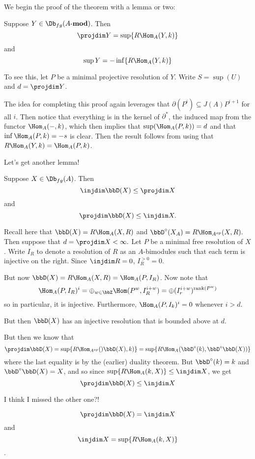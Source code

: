 \documentclass[12pt]{article}
\newcommand*{\Amod}{A\text{-}\mathbf{mod}}
\begin{document}
We begin the proof of the theorem with a lemma or two:
\begin{lem}
	Suppose $Y\in\Db_{fg}(\Amod)$. Then 
	\[\projdim Y=\sup\{R\Hom_A(Y,k)\}\]
	and 
	\[\sup Y=-\inf\{R\Hom_A(Y,k)\}\]
\end{lem}
\begin{prf}
	To see this, let $P$ be a minimal projective resolution of $Y$. Write $S=\sup(U)$ and $d=\projdim Y$.
	
	The idea for completing this proof again leverages that $\partial(P^i)\subseteq J(A)P^{i+1}$ for all $i$. Then notice that 
	everything is in the kernel of $\partial^\ast$, the induced map from the functor $\Hom_A(-,k)$, which then implies that
	$\sup(\Hom_A(P,k))=d$ and that $\inf \Hom_A(P,k)=-s$ is clear. Then the result follows from using that $R\Hom_A(Y,k)=\Hom_A(P,k)$.
\end{prf}
Let's get another lemma!
\begin{lem}
	Suppose $X\in\Db_{fg}(A)$. Then 
	\[\injdim\bbD(X)\le \projdim X\]
	and 
	\[\projdim \bbD(X)\le\injdim X.\]
\end{lem}
\begin{prf}
	Recall here that $\bbD(X)=R\Hom_A(X,R)$ and $\bbD^\circ(X_A)=R\Hom_{A^{op}}(X,R).$ Then suppose that $d=\projdim X<\infty.$ Let $P$ be a minimal 
	free resolution of $X$. Write $I_R$ to denote a resolution of $R$ as an $A$-bimodules such that each term is injective on the right. Since $\injdim R=0$, $I_R^{>0}=0.$

	But now $\bbD(X)=R\Hom_A(X,R)=\Hom_A(P,I_R)$. Now note that 
	\[\Hom_A(P,I_R)^i=\oplus_{w\in\bbZ}\Hom(P^w,I_R^{i+w})=\oplus (I_r^{i+w})^{\operatorname{rank}(P^w)}\]
	so in particular, it is injective. Furthermore, $\Hom_A(P,I_k)^i=0$ whenever $i>d.$

	But then $\bbD(X)$ has an injective resolution that is bounded above at $d$.

	But then we know that 
	\[\projdim \bbD(X)=\sup\{R\Hom_{A^{op}}()\bbD(X),k)\}=\sup\{R\Hom_A(\bbD^\circ(k),\bbD^\circ\bbD(X))\}\]
	where the last equality is by the (earlier) duality theorem. But $\bbD^\circ(k)=k$ and $\bbD^\circ\bbD(X)=X$,
	and so since $\sup\{R\Hom_A(k,X)\}\le\injdim X$, we get
	\[\projdim\bbD(X)\le\injdim X\]

	I think I missed the other one?!
\end{prf}
\begin{cor}\label{cor-equalities}
	\[\projdim \bbD(X)=\injdim X\] 
	and 
	\[\injdim X=\sup\{R\Hom_A(k,X)\}\].
\end{cor}
\end{document}
